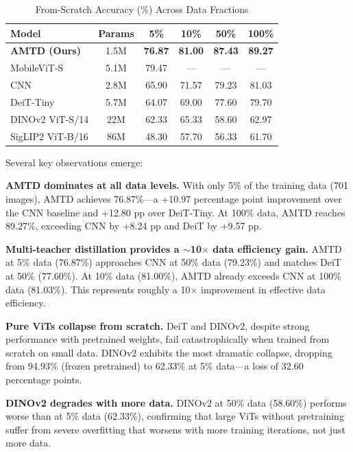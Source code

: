 \documentclass[journal]{IEEEtran}
\begin{document}
\begin{table}[!t]
\renewcommand{\arraystretch}{1.3}
\caption{From-Scratch Accuracy (\%) Across Data Fractions}
\label{tab:scratch_results}
\centering
\begin{tabular}{lccccc}
\toprule
\textbf{Model} & \textbf{Params} & \textbf{5\%} & \textbf{10\%} & \textbf{50\%} & \textbf{100\%} \\
\midrule
\textbf{AMTD (Ours)} & 1.5M & \textbf{76.87} & \textbf{81.00} & \textbf{87.43} & \textbf{89.27} \\
MobileViT-S   & 5.1M & 79.47 & --- & --- & --- \\
CNN           & 2.8M & 65.90 & 71.57 & 79.23 & 81.03 \\
DeiT-Tiny     & 5.7M & 64.07 & 69.00 & 77.60 & 79.70 \\
DINOv2 ViT-S/14 & 22M & 62.33 & 65.33 & 58.60 & 62.97 \\
SigLIP2 ViT-B/16 & 86M & 48.30 & 57.70 & 56.33 & 61.70 \\
\bottomrule
\end{tabular}
\end{table}

Several key observations emerge:

\textbf{AMTD dominates at all data levels.} With only 5\% of the training data (701 images),
AMTD achieves 76.87\%---a +10.97 percentage point improvement over the CNN baseline and
+12.80 pp over DeiT-Tiny. At 100\% data, AMTD reaches 89.27\%, exceeding CNN by +8.24 pp
and DeiT by +9.57 pp.

\textbf{Multi-teacher distillation provides a $\sim$10$\times$ data efficiency gain.}
AMTD at 5\% data (76.87\%) approaches CNN at 50\% data (79.23\%) and matches DeiT at 50\%
(77.60\%). At 10\% data (81.00\%), AMTD already exceeds CNN at 100\% data (81.03\%). This
represents roughly a 10$\times$ improvement in effective data efficiency.

\textbf{Pure ViTs collapse from scratch.} DeiT and DINOv2, despite strong performance with
pretrained weights, fail catastrophically when trained from scratch on small data. DINOv2
exhibits the most dramatic collapse, dropping from 94.93\% (frozen pretrained) to 62.33\%
at 5\% data---a loss of 32.60 percentage points.

\textbf{DINOv2 degrades with more data.} DINOv2 at 50\% data (58.60\%) performs worse than
at 5\% data (62.33\%), confirming that large ViTs without pretraining suffer from severe
overfitting that worsens with more training iterations, not just more data.
\end{document}
